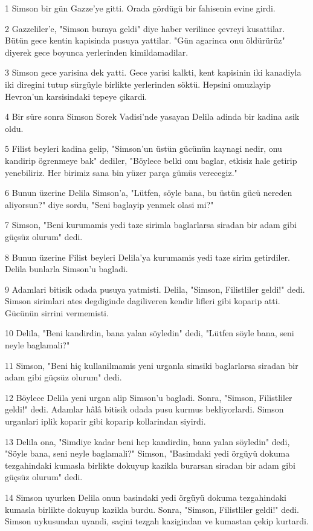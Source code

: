 \par 1 Simson bir gün Gazze'ye gitti. Orada gördügü bir fahisenin evine girdi.
\par 2 Gazzeliler'e, "Simson buraya geldi" diye haber verilince çevreyi kusattilar. Bütün gece kentin kapisinda pusuya yattilar. "Gün agarinca onu öldürürüz" diyerek gece boyunca yerlerinden kimildamadilar.
\par 3 Simson gece yarisina dek yatti. Gece yarisi kalkti, kent kapisinin iki kanadiyla iki diregini tutup sürgüyle birlikte yerlerinden söktü. Hepsini omuzlayip Hevron'un karsisindaki tepeye çikardi.
\par 4 Bir süre sonra Simson Sorek Vadisi'nde yasayan Delila adinda bir kadina asik oldu.
\par 5 Filist beyleri kadina gelip, "Simson'un üstün gücünün kaynagi nedir, onu kandirip ögrenmeye bak" dediler, "Böylece belki onu baglar, etkisiz hale getirip yenebiliriz. Her birimiz sana bin yüzer parça gümüs verecegiz."
\par 6 Bunun üzerine Delila Simson'a, "Lütfen, söyle bana, bu üstün gücü nereden aliyorsun?" diye sordu, "Seni baglayip yenmek olasi mi?"
\par 7 Simson, "Beni kurumamis yedi taze sirimla baglarlarsa siradan bir adam gibi güçsüz olurum" dedi.
\par 8 Bunun üzerine Filist beyleri Delila'ya kurumamis yedi taze sirim getirdiler. Delila bunlarla Simson'u bagladi.
\par 9 Adamlari bitisik odada pusuya yatmisti. Delila, "Simson, Filistliler geldi!" dedi. Simson sirimlari ates degdiginde dagiliveren kendir lifleri gibi koparip atti. Gücünün sirrini vermemisti.
\par 10 Delila, "Beni kandirdin, bana yalan söyledin" dedi, "Lütfen söyle bana, seni neyle baglamali?"
\par 11 Simson, "Beni hiç kullanilmamis yeni urganla simsiki baglarlarsa siradan bir adam gibi güçsüz olurum" dedi.
\par 12 Böylece Delila yeni urgan alip Simson'u bagladi. Sonra, "Simson, Filistliler geldi!" dedi. Adamlar hâlâ bitisik odada pusu kurmus bekliyorlardi. Simson urganlari iplik koparir gibi koparip kollarindan siyirdi.
\par 13 Delila ona, "Simdiye kadar beni hep kandirdin, bana yalan söyledin" dedi, "Söyle bana, seni neyle baglamali?" Simson, "Basimdaki yedi örgüyü dokuma tezgahindaki kumasla birlikte dokuyup kazikla burarsan siradan bir adam gibi güçsüz olurum" dedi.
\par 14 Simson uyurken Delila onun basindaki yedi örgüyü dokuma tezgahindaki kumasla birlikte dokuyup kazikla burdu. Sonra, "Simson, Filistliler geldi!" dedi. Simson uykusundan uyandi, saçini tezgah kazigindan ve kumastan çekip kurtardi.
